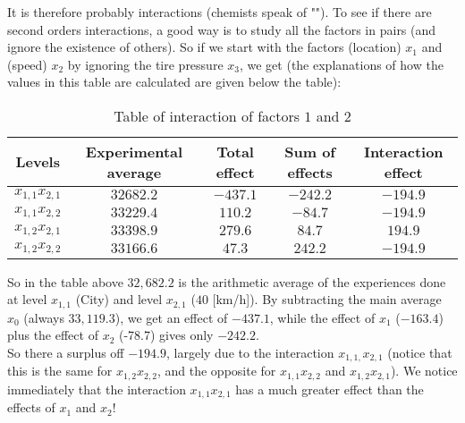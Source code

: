 	It is therefore probably interactions (chemists speak of ""). To see if there are second orders interactions, a good way is to study all the factors in pairs (and ignore the existence of others). So if we start with the factors (location) $x_1$ and (speed) $x_2$ by ignoring the tire pressure $x_3$, we get (the explanations of how the values in this table are calculated are given below the table):
	\begin{table}[H]\centering
		\centering
		\begin{tabular}{|c|c|c|c|c|}
		\hline
		\multicolumn{1}{c}{\cellcolor{black!30}\textbf{Levels}} & 
	  	\multicolumn{1}{c}{\cellcolor{black!30}Experimental average} & 
	  	\multicolumn{1}{c}{\cellcolor{black!30}Total effect} & 
	  	\multicolumn{1}{c}{\cellcolor{black!30}Sum of effects} & 
	  	\multicolumn{1}{c}{\cellcolor{black!30}Interaction effect} \\ \hline
		$x_{1,1}x_{2,1}$ & $32682.2$ & $-437.1$ & $-242.2$ & $-194.9$ \\ \hline
		$x_{1,1}x_{2,2}$ & $33229.4$ & $110.2$ & $-84.7$ & $-194.9$ \\ \hline
		$x_{1,2}x_{2,1}$ & $33398.9$ & $279.6$ & $84.7$ & $194.9$ \\ \hline
		$x_{1,2}x_{2,2}$ & $33166.6$ & $47.3$ & $242.2$ & $-194.9$ \\ \hline
	 	\end{tabular}
		\caption[]{Table of interaction of factors $1$ and $2$}
	\end{table}
	So in the table above $32,682.2$ is the arithmetic average of the experiences done at level $x_{1,1}$ (City) and level $x_{2,1}$ ($40$ [km/h]). By subtracting the main average $x_0$ (always $33,119.3$), we get an effect of $-437.1$, while the effect of $x_1$ ($-163.4$) plus the effect of $x_2$ (-78.7) gives only $-242.2$.\\

	So there a surplus off $-194.9$, largely due to the interaction $x_{1,1,}x_{2,1}$ (notice that this is the same for $x_{1,2}x_{2,2}$, and the opposite for $x_{1,1}x_{2,2}$ and $x_{1,2}x_{2,1}$). We notice immediately that the interaction  $x_{1,1}x_{2,1}$ has a much greater effect than the effects of $x_1$ and $x_2$!\\

